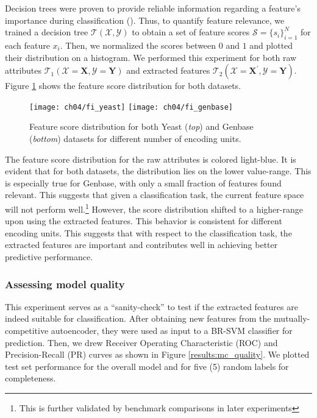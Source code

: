 \par Decision trees were proven to provide reliable information regarding a
feature's importance during classification (\cite{kazemitbar2017variable}).
Thus, to quantify feature relevance, we trained a decision tree
$\mathcal{T}(\mathcal{X}, \mathcal{Y})$ to obtain a set of feature scores
$\mathcal{S} = \{s_{i}\}_{i=1}^{N}$ for each feature ${x}_{i}$. Then, we
normalized the scores between $0$ and $1$ and plotted their distribution on a
histogram. We performed this experiment for both raw attributes
$\mathcal{T}_{1}(\mathcal{X}=\mathbf{X}, \mathcal{Y}=\mathbf{Y})$ and
extracted features $\mathcal{T}_{2}(\mathcal{X}=\mathbf{X}^{\prime},
\mathcal{Y}=\mathbf{Y})$. Figure \ref{results:mc_score_distribution} shows
the feature score distribution for both datasets.

\begin{figure}[!h]
  \centering
  \texttt{[image: ch04/fi\_yeast]}
  \texttt{[image: ch04/fi\_genbase]}
  \caption[Feature score distribution for the two protein benchmarks]{
    Feature score distribution for both Yeast (\textit{top}) and Genbase
    (\textit{bottom}) datasets for different number of encoding units.
  }
  \label{results:mc_score_distribution}
\end{figure}

\par The feature score distribution for the raw attributes is colored
light-blue. It is evident that for both datasets, the distribution lies on
the lower value-range. This is especially true for Genbase, with only a small
fraction of features found relevant. This suggests that given a
classification task, the current feature space will not perform
well.\footnote{This is further validated by benchmark comparisons in later
experiments} However, the score distribution shifted to a higher-range upon
using the extracted features. This behavior is consistent for different
encoding units. This suggests that with respect to the classification task,
the extracted features are important and contributes well in achieving better
predictive performance.

\subsubsection{Assessing model quality}

This experiment serves as a ``sanity-check'' to test if the extracted
features are indeed suitable for classification. After obtaining new features
from the mutually-competitive autoencoder, they were used as input to a
BR-SVM classifier for prediction. Then, we drew Receiver Operating
Characteristic (ROC) and Precision-Recall (PR) curves as shown in Figure
\ref{results:mc_quality}. We plotted test set performance for the overall
model and for five (5) random labels for completeness.

